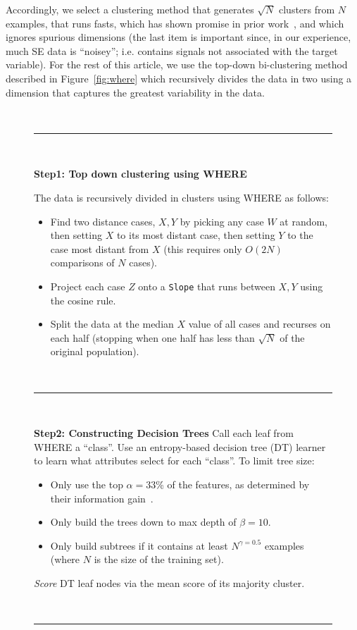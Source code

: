 \documentclass[conference]{IEEEtran}
\newcommand{\bi}{\begin{itemize}}
\newcommand{\ei}{\end{itemize}}
\newcommand{\fig}[1]{Figure~\ref{fig:#1}}
\begin{document}
	Accordingly, we select a clustering method that generates $\sqrt{N}$ clusters
	from $N$ examples, that runs fasts, which has shown promise in prior work~\cite{Menzies2013}, and which ignores spurious dimensions (the last item is important since, in our experience, much SE data is ``noisey''; i.e. contains signals not associated with the target variable). For the rest of this article,
	we use  the top-down
	bi-clustering method described in \fig{where} which recursively divides the
	data in two  using a dimension that captures the greatest variability in the data. 
	\begin{figure}[t]
		\small
		~\hrule~
		
		{\bf Step1: Top down clustering using WHERE}
		
		The data is recursively divided in clusters using WHERE as follows:
		\begin{itemize}
			
			\item Find   two   distance cases,  $X,Y$
			by picking any case $W$ at random, then setting $X$ to its most
			distant case, then setting $Y$ to the case most distant from
			$X$
			(this requires only $O(2N)$ comparisons
			of $N$ cases).
			\item Project each case $Z$
			onto a {\tt Slope} that  runs between $X,Y$ using the cosine
			rule. 
			\item Split the data at the median $X$ value of all cases and
			recurses on each half  (stopping when
			one half has less  than $\sqrt{N}$ of the original population).
		\end{itemize}
		~\hrule~
		
		{\bf Step2: Constructing Decision Trees}
		Call each leaf from WHERE a  ``class''. Use an entropy-based
		 decision tree (DT) learner to learn what attributes select for each ``class''. To limit tree size:
		 \bi
		 \item Only use the top $\alpha=33$\%  of the features, as determined by their information gain~\cite{Irani1993}. 
		 \item Only build the trees down to  max depth of $\beta=10$.
		 \item Only build subtrees if it contains at least $N^{\gamma=0.5}$ examples (where $N$ is the size of the training set).
\ei
{\em Score}  DT  leaf nodes  via the mean score of its majority cluster. 
		
		~\hrule~
		

\end{figure}
\end{document}
